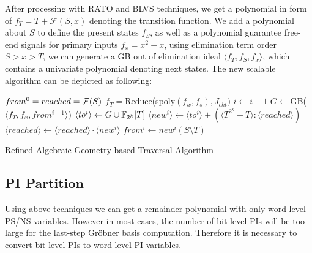 After processing with RATO and BLVS techniques, we get a polynomial in form of $f_T = T+\mathcal{F}(S,x)$
denoting the transition function. We add a polynomial about $S$ to define the present states $f_S$,
as well as a polynomial guarantee free-end signals for primary inputs $f_x = x^2+x$, using elimination term order $S>x>T$,
we can generate a GB out of elimination ideal $\langle f_T,f_S,f_x\rangle$, which contains a univariate
polynomial denoting next states. The new scalable algorithm can be depicted as following:

\begin{algorithm}[hbt]
\SetAlgoNoLine

  $from^0 = reached = {\mathcal{F}}(S)$\;
  $f_T = $Reduce(spoly$(f_w,f_s), J_{ckt})$\;
  {
  	$i \gets i + 1$\;
  	$G \gets$GB($\langle f_T ,f_x, from^{i-1}\rangle$)\;
	$\langle to^i \rangle \gets G\cup {\mathbb{F}}_{2^k}[T]$\;
	$\langle new^i\rangle \gets \langle to^i\rangle + (\langle T^{2^k}-T\rangle:\langle reached\rangle)$\;
  	$\langle reached\rangle \gets \langle reached\rangle \cdot \langle new^i\rangle$\;
	$from^i \gets new^i(S\setminus T)$\;
  }
\caption {Refined Algebraic Geometry based Traversal Algorithm}\label{alg:refined}
\end{algorithm}

\subsection{PI Partition}
Using above techniques we can get a remainder polynomial with only word-level PS/NS variables. However in most 
cases, the number of bit-level PIs will be too large for the last-step Gr\"obner basis computation. Therefore it is necessary
to convert bit-level PIs to word-level PI variables. 

